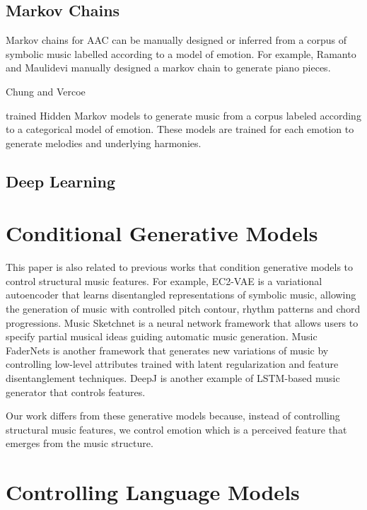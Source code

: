 \subsection{Markov Chains}

Markov chains for AAC can be manually designed or inferred from a corpus of symbolic music labelled
according to a model of emotion. For example, Ramanto and Maulidevi \cite{ramanto2017markov} manually designed a markov chain to generate piano pieces. 

Chung and Vercoe \cite{chung2006affective}

\cite{monteith2010automatic} trained Hidden Markov models to generate music
from a corpus labeled according to a categorical model of emotion. These models are trained for
each emotion to generate melodies and underlying harmonies.





\subsection{Deep Learning}

\section{Conditional Generative Models}

This paper is also related to previous works that condition generative models to control structural music features. For example, EC2-VAE \cite{yang2019deep} is a variational autoencoder that learns disentangled representations of symbolic music, allowing the generation of music with controlled pitch contour, rhythm patterns and chord progressions. Music Sketchnet \cite{chen2020music} is a neural network framework that allows users to specify partial musical ideas guiding automatic music generation.  Music FaderNets \cite{tan2020music} is another framework that generates new variations of music by controlling low-level attributes trained with latent regularization and feature disentanglement techniques.
DeepJ \cite{} is another example of LSTM-based music generator that controls features.

Our work differs from these generative models because, instead of controlling structural music features, we control emotion which is a perceived feature that emerges from the music structure.

\section{Controlling Language Models}

